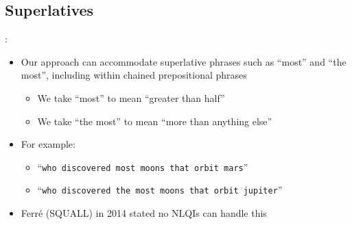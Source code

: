 \documentclass[logoontitle,tabu,supertabular,aspectratio=43]{preney-uwindsor-beamer}
\begin{document}
    \subsection{Superlatives}
    \begin{frame}{\insertsection: \insertsubsection}
        \begin{itemize}
            \item Our approach can accommodate superlative phrases such as ``most'' and ``the most'', including within chained prepositional phrases
            \begin{itemize}
                \item We take ``most'' to mean ``greater than half''
                \item We take ``the most'' to mean ``more than anything else''
            \end{itemize}
            \item For example:
            \begin{itemize}
                \item ``\texttt{who discovered most moons that orbit mars}''
                \item ``\texttt{who discovered the most moons that orbit jupiter}''
            \end{itemize}
            \item Ferré (SQUALL) in 2014 stated no NLQIs can handle this \cite{ferre2014squall}
        \end{itemize}
    \end{frame}

    \newcommand\biapply{\ensuremath{\mathbin{\ll\mkern-8mu*\mkern-8mu\gg}}}
\end{document}
